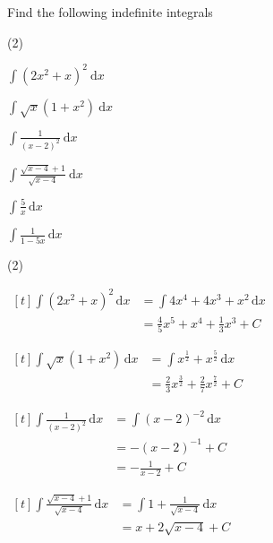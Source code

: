 \documentclass[11pt,a4paper]{book}
\begin{document}
\begin{example}

Find the following indefinite integrals

\begin{tasks}[label=(\alph*),label-width=3.5ex](2)

\task ${\displaystyle \int(2x^{2}+x)^{2}\:\mathrm{d}x}$

\task ${\displaystyle \int\sqrt{x}(1+x^{2})\:\mathrm{d}x}$

\task  ${\displaystyle \int\frac{1}{(x-2)^{2}}\:\mathrm{d}x}$

\task  ${\displaystyle \int\frac{\sqrt{x-4}+1}{\sqrt{x-4}}\:\mathrm{d}x}$

\task ${\displaystyle \int\frac{5}{x}\,\mathrm{d}x}$

\task ${\displaystyle \int\frac{1}{1-5x}\,\mathrm{d}x}$

\end{tasks}

\Solution

\begin{tasks}[label=(\alph*),label-width=3.5ex,after-item-skip = 1cm](2)

\task
$
\begin{aligned}[t]
{\displaystyle \int(2x^{2}+x)^{2}\, \mathrm{d}x} & =\int4x^{4}+4x^{3}+x^{2}\, \mathrm{d}x\\
 & =\frac{4}{5}x^{5}+x^{4}+\frac{1}{3}x^{3}+C
\end{aligned}
$

\task
$
\begin{aligned}[t]
{\displaystyle \int\sqrt{x}(1+x^{2})\, \mathrm{d}x} & =\int x^{\frac{1}{2}}+x^{\frac{5}{2}}\, \mathrm{d}x\\
 & =\frac{2}{3}x^{\frac{3}{2}}+\frac{2}{7}x^{\frac{7}{2}}+C
\end{aligned}
$

\task
$
\begin{aligned}[t]
{\displaystyle \int\frac{1}{(x-2)^{2}}\, \mathrm{d}x} & ={\displaystyle \int(x-2)^{-2}\, \mathrm{d}x}\\
 & =-(x-2)^{-1}+C\\
 & =-\frac{1}{x-2}+C
\end{aligned}
$



\task
$
\begin{aligned}[t]
{\displaystyle \int\frac{\sqrt{x-4}+1}{\sqrt{x-4}}\, \mathrm{d}x} & ={\displaystyle \int1+\frac{1}{\sqrt{x-4}}\, \mathrm{d}x}\\
 & =x+2\sqrt{x-4}+C
\end{aligned}
$


\end{tasks}
\end{example}
\end{document}
